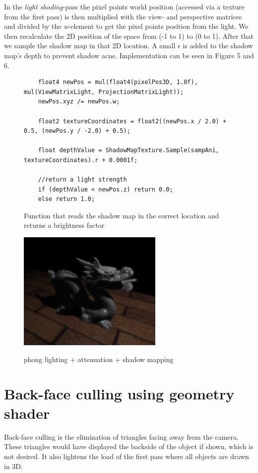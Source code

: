 \documentclass[a4paper,11pt]{article}
\begin{document}
In the \textit{light shading}-pass the pixel points world position (accessed via a texture from the first pass) is then multiplied with the view- and perspective matrices and divided by the \textit{w}-element to get the pixel points position from the light. We then recalculate the 2D position of the space from (-1 to 1) to (0 to 1). After that we sample the shadow map in that 2D location. A small $\epsilon$ is added to the shadow map's depth to prevent shadow acne. Implementation can be seen in Figure 5 and 6. 

\begin{figure}[ht!]
\begin{lstlisting}
	float4 newPos = mul(float4(pixelPos3D, 1.0f), mul(ViewMatrixLight, ProjectionMatrixLight));
	newPos.xyz /= newPos.w;

	float2 textureCoordinates = float2((newPos.x / 2.0) + 0.5, (newPos.y / -2.0) + 0.5);

	float depthValue = ShadowMapTexture.Sample(sampAni, textureCoordinates).r + 0.0001f;

	//return a light strength
	if (depthValue < newPos.z) return 0.0;
	else return 1.0;
\end{lstlisting}
\caption{Function that reads the shadow map in the correct location and returns a brightness factor}
\end{figure}

\begin{figure}[ht!]
	\begin{center}
		\label{fin}
		\includegraphics[width=7cm]{pic/final_shadow.png}
		\caption{phong lighting + attenuation + shadow mapping}
	\end{center}
\end{figure}

\newpage
\section{Back-face culling using geometry shader}
Back-face culling is the elimination of triangles facing away from the camera. These triangles would have displayed the backside of the object if shown, which is not desired. It also lightens the load of the first pass where all objects are drawn in 3D.
\end{document}
